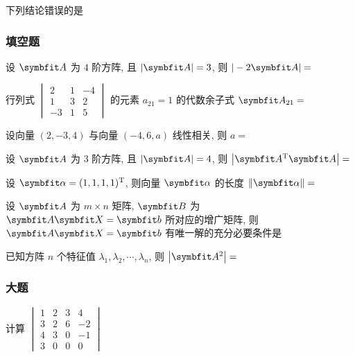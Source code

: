 \begin{ti}
	下列结论错误的是 \kuo
\end{ti}

\subsubsection{填空题}
\begin{ti}
	设 $\bA$ 为 $4$ 阶方阵, 且 $|\bA| = 3$, 则 $|-2 \bA| = $ \hua
\end{ti}

\begin{ti}
	行列式 $\begin{vmatrix}
		2 & 1 & -4 \\
		1 & 3 & 2 \\
		-3 & 1 & 5
	\end{vmatrix}$ 的元素 $a_{21} = 1$ 的代数余子式 $\bA_{21} = $ \hua
\end{ti}

\begin{ti}
	设向量 $(2,-3,4)$ 与向量 $(-4,6,a)$ 线性相关, 则 $a = $ \hua
\end{ti}

\begin{ti}
	设 $\bA$ 为 $3$ 阶方阵, 且 $|\bA| = 4$, 则 $\bigl|\bA^{\TT} \bA\bigr| = $ \hua
\end{ti}

\begin{ti}
	设 $\balpha = (1,1,1,1)^{\TT}$, 则向量 $\balpha$ 的长度 $\| \balpha \| = $ \hua
\end{ti}

\begin{ti}
	设 $\bA$ 为 $m \times n$ 矩阵, $\symbfit B$ 为 $\bA \bX = \symbfit b$ 所对应的增广矩阵, 则 $\bA \bX = \symbfit b$ 有唯一解的充分必要条件是 \hua
\end{ti}

\begin{ti}
	已知方阵 $n$ 个特征值 $\lambda_{1},\lambda_{2},\cdots,\lambda_{n}$, 则 $\bigl|\bA^{2}\bigr| = $ \hua
\end{ti}

\subsubsection{大题}
\begin{ti}
	计算 $\begin{vmatrix}
		1 & 2 & 3 & 4 \\
		3 & 2 & 6 & -2 \\
		4 & 3 & 0 & -1 \\
		3 & 0 & 0 & 0
	\end{vmatrix}$
\end{ti}

